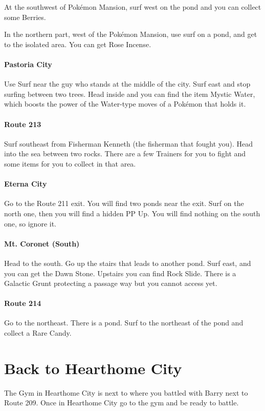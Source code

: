 \documentclass[11pt]{article}
\begin{document}
At the southwest of Pokémon Mansion, surf west on the pond and you can collect some Berries.

In the northern part, west of the Pokémon Mansion, use surf on a pond, and get to the isolated area.
You can get Rose Incense.

\paragraph{Pastoria City}
Use Surf near the guy who stands at the middle of the city.
Surf east and stop surfing between two trees.
Head inside and you can find the item Mystic Water,
which boosts the power of the Water-type moves of a Pokémon that holds it.

\paragraph{Route 213}
Surf southeast from Fisherman Kenneth (the fisherman that fought you).
Head into the sea between two rocks.
There are a few Trainers for you to fight and some items for you to collect in that area.

\paragraph{Eterna City}
Go to the Route 211 exit.
You will find two ponds near the exit.
Surf on the north one, then you will find a hidden PP Up.
You will find nothing on the south one, so ignore it.

\paragraph{Mt. Coronet (South)}
Head to the south.
Go up the stairs that leads to another pond.
Surf east, and you can get the Dawn Stone.
Upstairs you can find Rock Slide.
There is a Galactic Grunt protecting a passage way but you cannot access yet.

\paragraph{Route 214}
Go to the northeast.
There is a pond.
Surf to the northeast of the pond and collect a Rare Candy.

\section{Back to Hearthome City}\label{sec:back-to-hearthome-city}
The Gym in Hearthome City is next to where you battled with Barry next to Route 209.
Once in Hearthome City go to the gym and be ready to battle.
\end{document}
